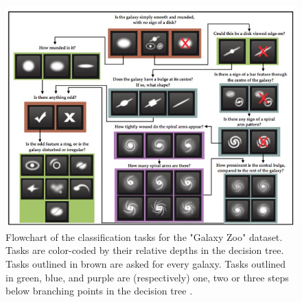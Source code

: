 \begin{figure}[h] \label{decision-tree}
  \centering
  \includegraphics[scale=0.9]{figures/decision-tree.jpg}
  \caption{Flowchart of the classification tasks for the "Galaxy Zoo" dataset. Tasks are color-coded by their relative depths in the decision tree. Tasks outlined in brown are asked for every galaxy. Tasks outlined in green, blue, and purple are (respectively) one, two or three steps below branching points in the decision tree \cite{galaxyzoo2}.}
\end{figure}
